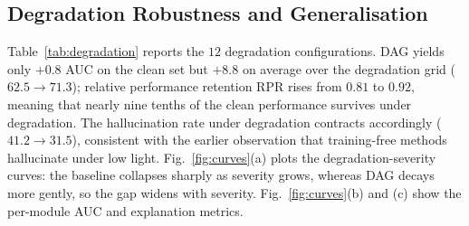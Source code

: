 \begin{table}[t]
\centering
\small
\caption{Ablation study on UCF-Crime. $\checkmark$ marks an enabled module; lower HR is better.}
\label{tab:ablation}
\end{table}

\subsection{Degradation Robustness and Generalisation}

Table~\ref{tab:degradation} reports the $12$ degradation configurations. DAG yields only $+0.8$ AUC on the clean set but $+8.8$ on average over the degradation grid ($62.5 \rightarrow 71.3$); relative performance retention RPR rises from $0.81$ to $0.92$, meaning that nearly nine tenths of the clean performance survives under degradation. The hallucination rate under degradation contracts accordingly ($41.2 \rightarrow 31.5$), consistent with the earlier observation that training-free methods hallucinate under low light. Fig.~\ref{fig:curves}(a) plots the degradation-severity curves: the baseline collapses sharply as severity grows, whereas DAG decays more gently, so the gap widens with severity. Fig.~\ref{fig:curves}(b) and (c) show the per-module AUC and explanation metrics.

